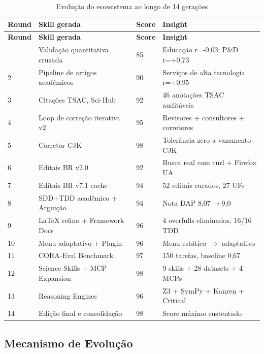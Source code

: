 \documentclass[
  brazil,
  sumario=tradicional,
  10pt
]{abntex2}
\begin{document}
\begin{longtable}{p{2cm}p{4cm}p{2cm}p{4cm}}
  \caption{Evolução do ecossistema ao longo de 14 gerações}
  \label{tab:evolucao}\\
  \toprule
  \textbf{Round} & \textbf{Skill gerada} & \textbf{Score} & \textbf{Insight} \\
  \midrule
  \endfirsthead
  \toprule
  \textbf{Round} & \textbf{Skill gerada} & \textbf{Score} & \textbf{Insight} \\
  \midrule
  \endhead
  \bottomrule
  \endfoot
  1  & Validação quantitativa cruzada & 85  & Educação r=-0,03; P\&D r=+0,73 \\
  2  & Pipeline de artigos acadêmicos & 90  & Serviços de alta tecnologia r=+0,95 \\
  3  & Citações TSAC, Sci-Hub         & 92  & 46 anotações TSAC auditáveis \\
  4  & Loop de correção iterativa v2  & 95  & Revisores + consultores + corretores \\
  5  & Corretor CJK                   & 98  & Tolerância zero a vazamento CJK \\
  6  & Editais BR v2.0                & 92  & Busca real com curl + Firefox UA \\
  7  & Editais BR v7.1 cache          & 94  & 52 editais curados, 27 UFs \\
  8  & SDD+TDD acadêmico + Arguição   & 94  & Nota DAP 8,07$\rightarrow$9,0 \\
  9  & LaTeX refino + Framework Docs  & 96  & 4 overfulls eliminados, 16/16 TDD \\
  10 & Menu adaptativo + Plugin       & 96  & Menu estático $\rightarrow$ adaptativo \\
  11 & CORA-Eval Benchmark            & 97  & 150 tarefas, baseline 0,67 \\
  12 & Science Skills + MCP Expansion & 98  & 9 skills + 28 datasets + 4 MCPs \\
  13 & Reasoning Engines              & 96  & Z3 + SymPy + Kanren + Critical \\
  14 & Edição final e consolidação    & 98  & Score máximo sustentado \\
\end{longtable}

\subsection{Mecanismo de Evolução}
\end{document}
